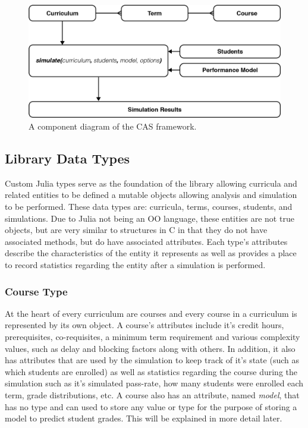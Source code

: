 \documentclass[botnum, fleqn]{unmeethesis}
\begin{document}
    \begin{figure}[h!]
      \centerline{\includegraphics[scale=0.4]{./figures/components.png}}
      \caption{A component diagram of the CAS framework.} 
      \label{fig:component_diagram}
    \end{figure}

    \subsection{Library Data Types}
      Custom Julia types serve as the foundation of the library allowing curricula and related entities to be defined a mutable objects allowing analysis and simulation to be performed. These data types are: curricula, terms, courses, students, and simulations. Due to Julia not being an OO language, these entities are not true objects, but are very similar to structures in C in that they do not have associated methods, but do have associated attributes. Each type's attributes describe the characteristics of the entity it represents as well as provides a place to record statistics regarding the entity after a simulation is performed.

      \subsubsection{Course Type}
        At the heart of every curriculum are courses and every course in a curriculum is represented by its own object. A course's attributes include it's credit hours, prerequisites, co-requisites, a minimum term requirement and various complexity values, such as delay and blocking factors along with others. In addition, it also has attributes that are used by the simulation to keep track of it's state (such as which students are enrolled) as well as statistics regarding the course during the simulation such as it's simulated pass-rate, how many students were enrolled each term, grade distributions, etc. A course also has an attribute, named \textit{model}, that has no type and can used to store any value or type for the purpose of storing a model to predict student grades. This will be explained in more detail later.
\end{document}
